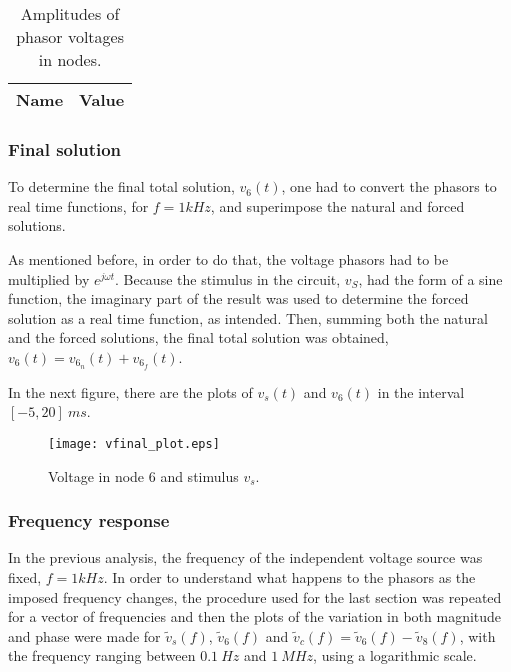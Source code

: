 



\begin{table}[H]
  \centering
  \begin{tabular}{|c|c|}
    \hline    
    {\bf Name} & {\bf Value} \\ \hline
    
  \end{tabular}
  \caption{Amplitudes of phasor voltages in nodes.}
  \label{tab:forced_amp}
\end{table}


\subsubsection{Final solution}  %
To determine the final total solution, $v_6(t)$, one had to convert the phasors to real time functions, for $f=1kHz$, and superimpose the natural and forced solutions.
\par
As mentioned before, in order to do that, the voltage phasors had to be multiplied by $e^{j \omega t}$. Because the stimulus in the circuit, $v_S$, had the form of a sine function, the imaginary part of the result was used to determine the forced solution as a real time function, as intended.
Then, summing both the natural and the forced solutions, the final total solution was obtained, $v_6(t) = v_{6_n} (t) + v_{6_f} (t)$.
\par
In the next figure, there are the plots of $v_s(t)$ and $v_6(t)$ in the interval $[-5, 20] \ ms$.


\begin{figure}[H] \centering
\texttt{[image: vfinal\_plot.eps]}
\caption{Voltage in node 6 and stimulus $v_s$.}
\label{fig:final}
\end{figure}



\subsubsection{Frequency response}  %
\label{sec:frequency}

In the previous analysis, the frequency of the independent voltage source was fixed, $f=1kHz$. In order to understand what happens to the phasors as the imposed frequency changes, the procedure used for the last section was repeated for a vector of frequencies and then the plots of the variation in both magnitude and phase were made for $\tilde{v}_s(f)$, $\tilde{v}_6(f)$ and $\tilde{v}_c(f) = \tilde{v}_6(f)-\tilde{v}_8(f)$, with the frequency ranging between $0.1 \ Hz$ and $1 \ MHz$, using a logarithmic scale.

